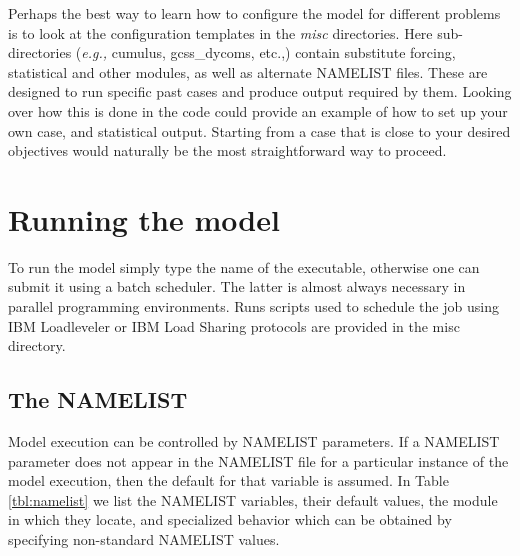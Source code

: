\documentclass[11pt,a4paper]{article}
\begin{document}
Perhaps the best way to learn how to configure the model for different
problems is to look at the configuration templates in the \emph{misc}
directories.  Here sub-directories (\emph{e.g.,} cumulus, gcss\_dycoms,
etc.,) contain substitute forcing, statistical and other modules, as
well as alternate NAMELIST files.  These are designed to run specific
past cases and produce output required by them.  Looking over how this
is done in the code could provide an example of how to set up your own
case, and statistical output.  Starting from a case that is close to
your desired objectives would naturally be the most straightforward
way to proceed.

\section{Running the model}

To run the model simply type the name of the executable, otherwise one
can submit it using a batch scheduler.  The latter is almost always
necessary in parallel programming environments.  Runs scripts used to
schedule the job using IBM Loadleveler or IBM Load Sharing protocols
are provided in the misc directory.

\subsection{The NAMELIST} 

Model execution can be controlled by NAMELIST parameters.  If a
NAMELIST parameter does not appear in the NAMELIST file for a
particular instance of the model execution, then the default for that
variable is assumed.  In Table \ref{tbl:namelist} we list the NAMELIST
variables, their default values, the module in which they locate, and
specialized behavior which can be obtained by specifying non-standard
NAMELIST values.
\end{document}
